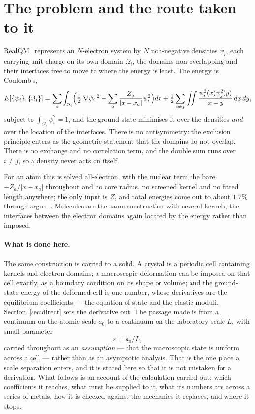 \documentclass[11pt]{article}
\newcommand{\half}{\tfrac12}
\newcommand{\grad}{\nabla}
\begin{document}
\section{The problem and the route taken to it}\label{sec:intro}

RealQM~\cite{realqm,realqmbook} represents an $N$-electron system by $N$ non-negative densities
$\psi_i$, each carrying unit charge on its own domain $\Omega_i$, the domains non-overlapping and
their interfaces free to move to where the energy is least. The energy is Coulomb's,
\begin{equation}\label{eq:E}
E[\{\psi_i\},\{\Omega_i\}]=\sum_i\int_{\Omega_i}\Bigl(\half|\grad\psi_i|^2
-\sum_a\frac{Z_a}{|x-x_a|}\psi_i^2\Bigr)dx
+\half\sum_{i\neq j}\iint\frac{\psi_i^2(x)\psi_j^2(y)}{|x-y|}\,dx\,dy ,
\end{equation}
subject to $\int_{\Omega_i}\psi_i^2=1$, and the ground state minimises it over the densities
\emph{and} over the location of the interfaces. There is no antisymmetry: the exclusion principle
enters as the geometric statement that the domains do not overlap. There is no exchange and no
correlation term, and the double sum runs over $i\neq j$, so a density never acts on itself.

For an atom this is solved all-electron, with the nuclear term the bare $-Z_a/|x-x_a|$ throughout
and no core radius, no screened kernel and no fitted length anywhere; the only input is $Z$, and
total energies come out to about $1.7\%$ through argon~\cite{atoms}. Molecules are the same
construction with several kernels, the interfaces between the electron domains again located by the
energy rather than imposed.

\paragraph{What is done here.} The same construction is carried to a solid. A crystal is a periodic
cell containing kernels and electron domains; a macroscopic deformation can be imposed on that cell
exactly, as a boundary condition on its shape or volume; and the ground-state energy of the deformed
cell is one number, whose derivatives are the equilibrium coefficients --- the equation of state and
the elastic moduli. Section~\ref{sec:direct} sets the derivative out. The passage made is from a
continuum on the atomic scale $a_0$ to a continuum on the laboratory scale $L$, with small parameter
\begin{equation}\label{eq:eps}
\varepsilon = a_0/L ,
\end{equation}
carried throughout as an \emph{assumption} --- that the macroscopic state is uniform across a cell
--- rather than as an asymptotic analysis. That is the one place a scale separation enters, and it
is stated here so that it is not mistaken for a derivation. What follows is an account of the
calculation carried out: which coefficients it reaches, what must be supplied to it, what its
numbers are across a series of metals, how it is checked against the mechanics it replaces, and
where it stops.
\end{document}
